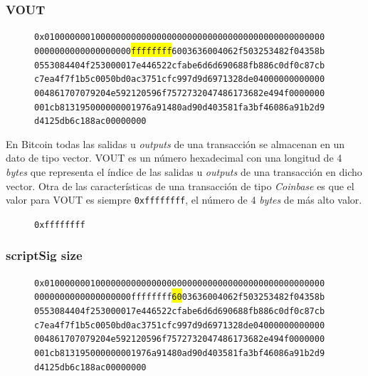 \documentclass{article}
\begin{document}
    \subsubsection{VOUT}
    
    \begin{figure}[H]
        \texttt{0x0100000001000000000000000000000000000000000000000000000} \\
        \texttt{0000000000000000000\colorbox{Yellow}{ffffffff}6003636004062f503253482f04358b} \\
        \texttt{0553084404f253000017e446522cfabe6d6d690688fb886c0df0c87cb} \\
        \texttt{c7ea4f7f1b5c0050bd0ac3751cfc997d9d6971328de04000000000000} \\
        \texttt{004861707079204e592120596f7572732047486173682e494f0000000} \\
        \texttt{001cb813195000000001976a91480ad90d403581fa3bf46086a91b2d9} \\
        \texttt{d4125db6c188ac00000000}
    \end{figure}
    
    En Bitcoin todas las salidas u \textit{outputs} de una transacción se almacenan en un dato de tipo vector. VOUT es un número hexadecimal con una longitud de 4 \textit{bytes} que representa el índice de las salidas u \textit{outputs} de una transacción en dicho vector. Otra de las características de una transacción de tipo \textit{Coinbase} es que el valor para VOUT es siempre \texttt{0xffffffff}, el número de 4 \textit{bytes} de más alto valor.
    \begin{figure}[H]
        \texttt{0xffffffff}
    \end{figure}
    
    \subsubsection{scriptSig size}
    
    \begin{figure}[H]
        \texttt{0x0100000001000000000000000000000000000000000000000000000} \\
        \texttt{0000000000000000000ffffffff\colorbox{Yellow}{60}03636004062f503253482f04358b} \\
        \texttt{0553084404f253000017e446522cfabe6d6d690688fb886c0df0c87cb} \\
        \texttt{c7ea4f7f1b5c0050bd0ac3751cfc997d9d6971328de04000000000000} \\
        \texttt{004861707079204e592120596f7572732047486173682e494f0000000} \\
        \texttt{001cb813195000000001976a91480ad90d403581fa3bf46086a91b2d9} \\
        \texttt{d4125db6c188ac00000000}
    \end{figure}
    
\end{document}
